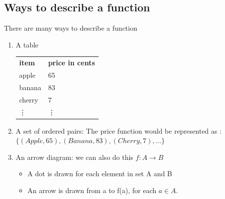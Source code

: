 \documentclass[../MATH-2000-Notes.tex]{subfiles}
\begin{document}
\subsection{Ways to describe a function}
There are many ways to describe a function
\begin{enumerate}
    \item A table\\
          \begin{tabular}{l|l}
              \textbf{item} & \textbf{price in cents} \\
              apple         & 65                      \\
              banana        & 83                      \\
              cherry        & 7                       \\
              \vdots        & \vdots
          \end{tabular}
    \item A set of ordered pairs: The price function would be represented as : \(\{(Apple, 65),(Banana, 83),(Cherry, 7),\dots\}\)
    \item An arrow diagram: we can also do this \(f: A\rightarrow B\)
          \begin{itemize}
              \item A dot is drawn for each element in set A and B
              \item An arrow is drawn from a to f(a), for each \(a\in A\).
          \end{itemize}
\end{enumerate}
\end{document}
